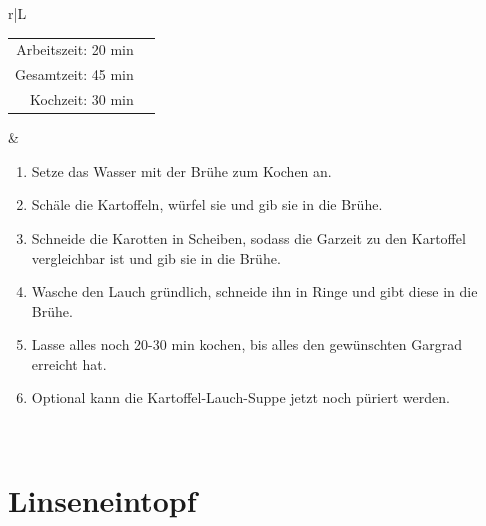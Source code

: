\documentclass[a4paper, 12pt]{scrbook} 								%
\numberwithin{equation}{section} 									%
\begin{document}
\begin{tabularx}{\textwidth}{r|L}
\begin{tabular}[t]{rr}
				Arbeitszeit: 20 min	\\
				Gesamtzeit:	45 min		\\
				Kochzeit: 30 min	\\
			\end{tabular}			&	\begin{enumerate}[nosep]
											\item Setze das Wasser mit der Brühe zum Kochen an.
											\item Schäle die Kartoffeln, würfel sie und gib sie in die Brühe.
											\item Schneide die Karotten in Scheiben, sodass die Garzeit zu den Kartoffel vergleichbar ist und gib sie in die Brühe.
											\item Wasche den Lauch gründlich, schneide ihn in Ringe und gibt diese in die Brühe.
											\item Lasse alles noch 20-30 min kochen, bis alles den gewünschten Gargrad erreicht hat.
											\item Optional kann die Kartoffel-Lauch-Suppe jetzt noch püriert werden.
										\end{enumerate}	\\
		\end{tabularx}
		\newpage



		\section{Linseneintopf}	\label{linseneintopf}
\end{document}
